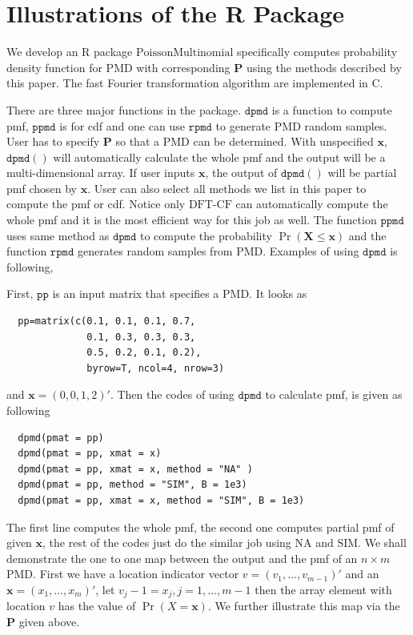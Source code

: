 \documentclass[12pt]{article}
\newcommand{\Pmat}{\mathbf{P}}
\newcommand{\PMD}{\textrm{PMD}}
\newcommand{\Xvec}{\boldsymbol{X}}
\newcommand{\xvec}{\boldsymbol{x}}
\newcommand{\code}{\texttt}
\newcommand{\SIM}{{\textrm{SIM}}}
\newcommand{\NA}{{\textrm{NA}}}
\newcommand{\dft}{{\textrm{DFT-CF}}}
\begin{document}
\section{Illustrations of the R Package}
We develop an R package $\textrm{PoissonMultinomial}$ specifically computes probability density function for $\PMD$ with corresponding $\Pmat$ using the methods described by this paper. The fast Fourier transformation algorithm are implemented in C.

There are three major functions in the package. $\code{dpmd}$ is a function to compute pmf, $\code{ppmd}$ is for cdf and one can use $\code{rpmd}$ to generate $\PMD$ random samples. User has to specify $\Pmat$ so that a $\PMD$ can be determined. With unspecified $\xvec$, $\code{dpmd}( )$ will automatically calculate the whole pmf and the output will be a multi-dimensional array. If user inputs $\xvec$, the output of $\code{dpmd}( )$ will be partial pmf chosen by $\xvec$. User can also select all methods we list in this paper to compute the pmf or cdf. Notice only $\dft$ can automatically compute the whole pmf and it is the most efficient way for this job as well. The function $\code{ppmd}$ uses same method as $\code{dpmd}$ to compute the probability $\Pr(\Xvec \leq \xvec)$ and the function $\code{rpmd}$ generates random samples from $\PMD$.  Examples of using $\code{dpmd}$ is following,

First, $\code{pp}$ is an input matrix that specifies a $\PMD$. It looks as
\begin{verbatim}
  pp=matrix(c(0.1, 0.1, 0.1, 0.7,
              0.1, 0.3, 0.3, 0.3,
              0.5, 0.2, 0.1, 0.2),
              byrow=T, ncol=4, nrow=3)
\end{verbatim}
and $\xvec=(0,0,1,2)'$. Then the codes of using $\code{dpmd}$ to calculate pmf, is given as following
\begin{verbatim}
  dpmd(pmat = pp)
  dpmd(pmat = pp, xmat = x)
  dpmd(pmat = pp, xmat = x, method = "NA" )
  dpmd(pmat = pp, method = "SIM", B = 1e3)
  dpmd(pmat = pp, xmat = x, method = "SIM", B = 1e3)
\end{verbatim}
The first line computes the whole pmf, the second one computes partial pmf of given $\xvec$, the rest of the codes just do the similar job using $\NA$ and $\SIM$.
We shall demonstrate the one to one map between the output and the pmf of an $n \times m$ $\PMD$. First we have a location indicator vector $v = (v_1, \dots, v_{m-1})'$ and an $\xvec=(x_1,\dots,x_m)'$, let $v_j-1 = x_j, j =1,\dots,m-1$ then the array element with location $v$ has the value of $\Pr(X=\xvec)$. We further illustrate this map via the $\Pmat$ given above.
\end{document}
